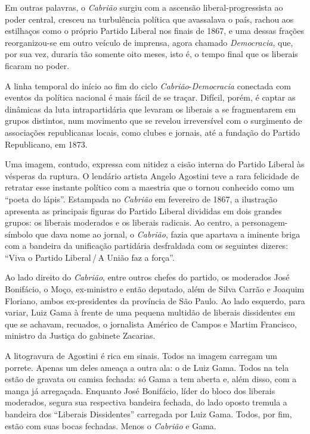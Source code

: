 Em outras palavras, o \emph{Cabrião} surgiu com a ascensão
liberal-progressista ao poder central, cresceu na turbulência política
que avassalava o país, rachou aos estilhaços como o próprio Partido
Liberal nos finais de 1867, e uma dessas frações reorganizou-se em outro
veículo de imprensa, agora chamado \emph{Democracia}, que, por sua vez,
duraria tão somente oito meses, isto é, o tempo final que os liberais
ficaram no poder.

A linha temporal do início ao fim do ciclo
\emph{Cabrião}-\emph{Democracia} conectada com eventos da política
nacional é mais fácil de se traçar. Difícil, porém, é captar as
dinâmicas da luta intrapartidária que levaram os liberais a se
fragmentarem em grupos distintos, num movimento que se revelou
irreversível com o surgimento de associações republicanas locais, como
clubes e jornais, até a fundação do Partido Republicano, em 1873.

Uma imagem, contudo, expressa com nitidez a cisão interna do Partido
Liberal às vésperas da ruptura. O lendário artista Angelo Agostini teve
a rara felicidade de retratar esse instante político com a maestria que
o tornou conhecido como um ``poeta do lápis''. Estampada no \emph{Cabrião}
em fevereiro de 1867, a ilustração apresenta as principais figuras do %
Partido Liberal divididas em dois grandes grupos: os liberais moderados
e os liberais radicais. Ao centro, a personagem-símbolo que dava nome ao
jornal, o \emph{Cabrião}, fazia que apartava a iminente briga com a
bandeira da unificação partidária desfraldada com os seguintes dizeres:
``Viva o Partido Liberal\,/\,A União faz a força''.

Ao lado direito do \emph{Cabrião}, entre outros chefes do partido, os
moderados José Bonifácio, o Moço, ex-ministro e então deputado, além de
Silva Carrão e Joaquim Floriano, ambos ex-presidentes da província de
São Paulo. Ao lado esquerdo, para variar, Luiz Gama à frente de uma
pequena multidão de liberais dissidentes em que se achavam, recuados, o
jornalista Américo de Campos e Martim Francisco, ministro da Justiça do
gabinete Zacarias.

A litogravura de Agostini é rica em sinais. Todos na imagem carregam um
porrete. Apenas um deles ameaça a outra ala: o de Luiz Gama. Todos na
tela estão de gravata ou camisa fechada: só Gama a tem aberta e, além
disso, com a manga já arregaçada. Enquanto José Bonifácio, líder do
bloco dos liberais moderados, segura sua respectiva bandeira fechada, do
lado oposto tremula a bandeira dos ``Liberais Dissidentes'' carregada por
Luiz Gama. Todos, por fim, estão com suas bocas fechadas. Menos o
\emph{Cabrião} e Gama.

